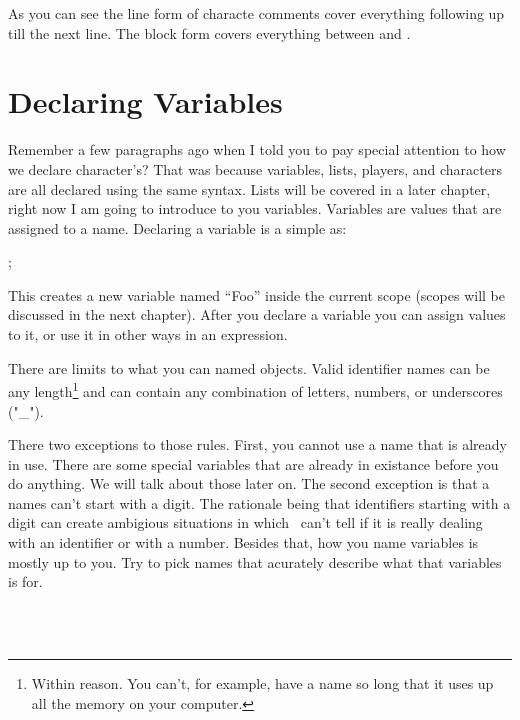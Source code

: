 \documentclass{book}
\begin{document}
As you can see the line form of characte comments cover everything following  up till the next line.  The block form covers everything between  and .

\section{Declaring Variables}

Remember a few paragraphs ago when I told you to pay special attention to how we declare character's?  That was because variables, lists, players, and characters are all declared using the same syntax.  Lists will be covered in a later chapter, right now I am going to introduce to you variables.  Variables are values that are assigned to a name.  Declaring a variable is a simple as:

\begin{SSCodeBox}
;
\end{SSCodeBox}

This creates a new variable named ``Foo'' inside the current scope (scopes will be discussed in the next chapter).  After you declare a variable you can assign values to it, or use it in other ways in an expression.

There are limits to what you can named objects. Valid identifier names can be any length\footnote{Within reason.  You can't, for example, have a name so long that it uses up all the memory on your computer.} and can contain any combination of letters, numbers, or underscores ("\_").  

There two exceptions to those rules. First, you cannot use a name that is already in use.  There are some special variables that are already in existance before you do anything.  We will talk about those later on.  The second exception is that a names can't start with a digit.  The rationale being that identifiers starting with a digit can create ambigious situations in which \SSquared\ can't tell if it is really dealing with an identifier or with a number.  Besides that, how you name variables is mostly up to you.  Try to pick names that acurately describe what that variables is for.

\begin{SSCodeBox}
 \\
 \\
\end{SSCodeBox}
\end{document}
